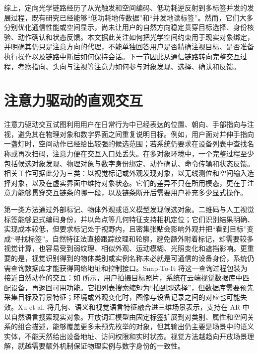 综上，定向光学链路经历了从光触发和空间编码、低功耗逆反射到多标签并发的发展过程，既有研究已经能够“低功耗地传数据”和“并发地读标签”。然而，它们大多分别优化通信性能或空间显示，尚未让用户的自然方向稳定贯穿目标选择、身份核验、动作确认和状态反馈。本文据此关注如何把光学空间约束用于现实对象绑定，并明确其仍只是注意方向的代理，不能单独回答用户是否精确注视目标、是否准备执行操作以及链路中断后如何保持会话。下一节因此从通信链路转向完整交互过程，考察指向、头向与注视等注意力如何参与对象发现、选择、确认和反馈。



\section{注意力驱动的直观交互}

注意力驱动交互试图利用用户在日常行为中已经表达的位置、朝向、手部指向与注视，避免其在物理对象和数字界面之间重复说明目标。例如，用户面对并伸手指向一盏灯时，空间动作已经给出较强的候选范围；若系统仍要求在设备列表中查找名称或再次扫码，注意力便在交互入口处丢失。在多对象环境中，一个完整过程至少包括候选对象发现、物理对象与数字身份绑定、动作确认、命令传输和状态反馈。相关工作可据此分为三类：以视觉标记或外观发现对象，以无线测位和空间输入选择对象，以及在虚实界面中维持对象状态。它们的差异不只在所用模态，更在于注意力能够贯穿交互链条的哪一段，以及链条断开后需要用户补充多少显式操作。

第一类方法通过外部标记、物体外观或语义模型发现候选对象。二维码与人工视觉标签能够显式编码身份，并以角点等几何特征支持相机定位；它们识别结果明确、实现成本较低，但要求标记处于视野内，且密集张贴会影响外观并把“看到目标”变成“寻找标签”。自然特征法直接跟踪纹理和轮廓，避免额外附着标记，却需要较多视觉计算，也容易受到弱纹理、相似外观、运动模糊、光照变化和遮挡影响\supercite{wagnertracking}。更重要的是，视觉识别得到的物体类别或实例名称未必就是可通信的设备身份，系统仍需查询数据库才能获得网络地址和控制接口。Snap-To-It\supercite{snaptoit} 将这一查询过程包装为接近自然动作的交互：如 所示，用户拍摄目标照片，系统在云端视觉数据库中匹配设备，再返回可用功能。它把列表搜索缩短为“拍到即选择”，但数据库需要预先采集目标及背景特征；环境或外观变化时，图像与设备记录之间的对应也可能失效。Xu et al. 将几何、语义和视觉语言特征融合进三维场景表示，支持在 AR 中以自然语言搜索现实对象\supercite{spatial_ai_2024}。开放词汇模型由固定标签扩展到对类别、属性和空间关系的组合描述，能够覆盖更多未预先枚举的对象，但其输出仍主要是场景中的语义实体，不能天然给出设备地址、访问权限和实时状态。视觉方法越趋向开放场景理解，就越需要额外机制保证物理实例与数字身份的一致性。

